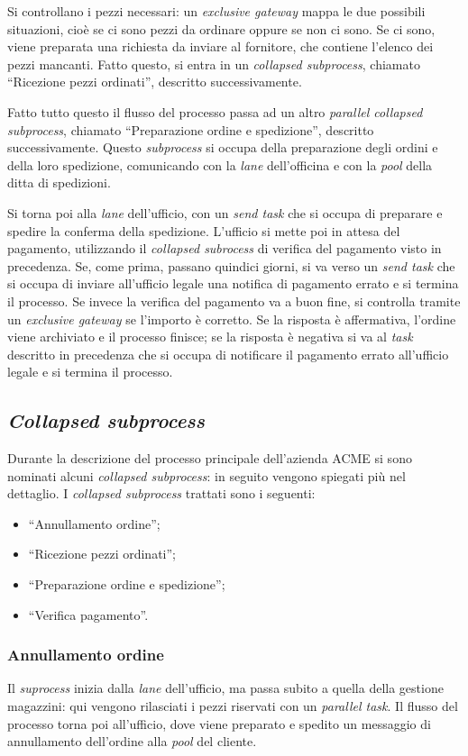 Si controllano i pezzi necessari: un \textit{exclusive gateway} mappa le
due possibili situazioni, cio\`e se ci sono pezzi da ordinare oppure se
non ci sono. Se ci sono, viene preparata una richiesta da inviare al
fornitore, che contiene l'elenco dei pezzi mancanti. Fatto questo, si
entra in un \textit{collapsed subprocess}, chiamato ``Ricezione pezzi
ordinati'', descritto successivamente.

Fatto tutto questo il flusso del processo passa ad un altro
\textit{parallel collapsed subprocess}, chiamato ``Preparazione ordine e
spedizione'', descritto successivamente. Questo \textit{subprocess} si
occupa della preparazione degli ordini e della loro spedizione,
comunicando con la \textit{lane} dell'officina e con la \textit{pool}
della ditta di spedizioni.

Si torna poi alla \textit{lane} dell'ufficio, con un \textit{send task}
che si occupa di preparare e spedire la conferma della spedizione.
L'ufficio si mette poi in attesa del pagamento, utilizzando il
\textit{collapsed subrocess} di verifica del pagamento visto in
precedenza. Se, come prima, passano quindici giorni, si va verso un
\textit{send task} che si occupa di inviare all'ufficio legale una
notifica di pagamento errato e si termina il processo. Se invece la
verifica del pagamento va a buon fine, si controlla tramite un
\textit{exclusive gateway} se l'importo \`e corretto. Se la risposta
\`e affermativa, l'ordine viene archiviato e il processo finisce; se la
risposta \`e negativa si va al \textit{task} descritto in precedenza che
si occupa di notificare il pagamento errato all'ufficio legale e si
termina il processo.

\subsection{\textit{Collapsed subprocess}}
Durante la descrizione del processo principale dell'azienda ACME si sono
nominati alcuni \textit{collapsed subprocess}: in seguito vengono
spiegati pi\`u nel dettaglio. I \textit{collapsed subprocess} trattati
sono i seguenti:
\begin{itemize}
  \item ``Annullamento ordine'';
  \item ``Ricezione pezzi ordinati'';
  \item ``Preparazione ordine e spedizione'';
  \item ``Verifica pagamento''.
\end{itemize}
\subsubsection{Annullamento ordine}
Il \textit{suprocess} inizia dalla \textit{lane} dell'ufficio, ma passa
subito a quella della gestione magazzini: qui vengono rilasciati i pezzi
riservati con un \textit{parallel task}. Il flusso del processo torna
poi all'ufficio, dove viene preparato e spedito un messaggio di
annullamento dell'ordine alla \textit{pool} del cliente.
